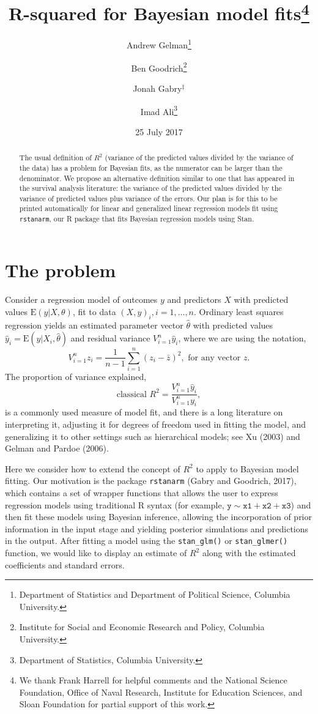 \documentclass[11pt]{article}
\title{\bf R-squared for Bayesian model fits\footnote{We thank Frank Harrell for helpful comments and the National Science Foundation, Office of Naval Research, Institute for Education Sciences, and Sloan Foundation for partial support of this work.}\vspace{.1in}}
\author{Andrew Gelman\footnote{Department of Statistics and Department of Political Science, Columbia University.} \and Ben Goodrich\footnote{Institute for Social and Economic Research and Policy, Columbia University.} \and Jonah Gabry$^\ddagger$ \and Imad Ali\footnote{Department of Statistics, Columbia University.}\vspace{.1in}}
\date{25 July 2017\vspace{-.1in}}
\begin{document}
\sloppy
\maketitle
\thispagestyle{empty}

\begin{abstract}
The usual definition of $R^2$ (variance of the predicted values divided by the
variance of the data) has a problem for Bayesian fits, as the numerator can be
larger than the denominator.  We propose an alternative definition similar to 
one that has appeared in the survival analysis literature:  the variance of the 
predicted values divided by the variance of predicted values plus variance of 
the errors. Our plan is for this to be printed automatically for linear and 
generalized linear regression models fit using {\tt rstanarm}, our R package 
that fits Bayesian regression models using Stan.
\end{abstract}

\section{The problem}

Consider a regression model of outcomes $y$ and predictors $X$ with predicted
values $\mbox{E}(y|X,\theta)$, fit to data $(X,y)_i, i=1,\ldots,n$.  Ordinary
least squares regression yields an estimated parameter vector $\hat{\theta}$
with predicted values $\hat{y}_i=\mbox{E}(y|X_i,\hat{\theta})$ and residual
variance $V_{i=1}^n \hat{y}_i$, where we are using the notation,
%
$$
V_{i=1}^nz_i = \frac{1}{n-1}\sum_{i=1}^n(z_i-\bar{z})^2, \mbox{ for any vector }z.
$$
%
The proportion of variance explained,
%
\begin{equation}\label{rsq1}
\mbox{classical } R^2=\frac{V_{i=1}^n\hat{y}_i}{V_{i=1}^n y_i},
\end{equation}
%
is a commonly used measure of model fit, and there is a long literature on
interpreting it, adjusting it for degrees of freedom used in fitting the model,
and generalizing it to other settings such as hierarchical models; see Xu (2003)
and Gelman and Pardoe (2006).

Here we consider how to extend the concept of $R^2$ to apply to Bayesian model
fitting.  Our motivation is the package {\tt rstanarm} (Gabry and Goodrich,
2017), which contains a set of wrapper functions that allows the user to express
regression models using traditional R syntax
(for example, $\mathtt{y \sim x1 + x2 + x3}$)
and then fit these models using Bayesian inference, allowing the incorporation
of prior information in the input stage and yielding posterior simulations and
predictions in the output.  After fitting a model using the \verb#stan_glm()#
or \verb#stan_glmer()# function, we would like to display an estimate of $R^2$ 
along with the estimated coefficients and standard errors.
\end{document}
